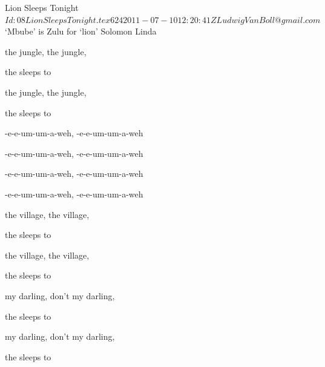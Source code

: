 \begin{SBSong}{Lion  Sleeps Tonight}
  {$Id: 08LionSleepsTonight.tex 624 2011-07-10 12:20:41Z LudwigVanBoll@gmail.com $}
  {`Mbube' is Zulu for `lion'}
  {Solomon Linda}
  \begin{SBVerse}
     the jungle, the  jungle, 

    the  sleeps to  

    the jungle, the  jungle, 

    the  sleeps to  
  \end{SBVerse}
  \begin{SBChorus}
    -e-e-um-um-a-weh, -e-e-um-um-a-weh
  
	-e-e-um-um-a-weh, -e-e-um-um-a-weh
	
    -e-e-um-um-a-weh, -e-e-um-um-a-weh
  
	-e-e-um-um-a-weh, -e-e-um-um-a-weh
  \end{SBChorus}  
  \begin{SBVerse}
     the village, the  village, 

    the  sleeps to  
    
     the village, the  village, 

    the  sleeps to  
  \end{SBVerse}
  \begin{SBVerse}
    
     my darling, don't  my darling, 
    
    the  sleeps to  

     my darling, don't  my darling, 

    the  sleeps to  
  \end{SBVerse}
\end{SBSong}

